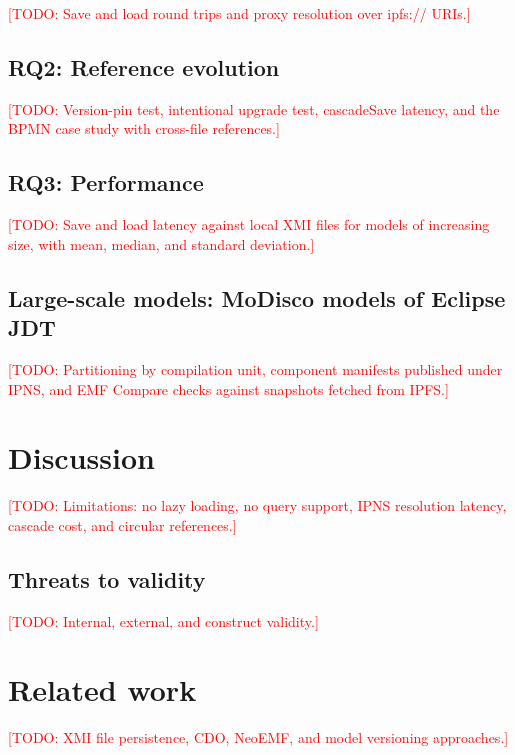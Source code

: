\documentclass[iicol,pdflatex,sn-mathphys-num]{sn-jnl}
\theoremstyle{thmstylethree}%
\newcommand{\todo}[1]{\textcolor{red}{[TODO: #1]}}
\begin{document}
\todo{Save and load round trips and proxy resolution over ipfs:// URIs.}

\subsection{RQ2: Reference evolution}\label{sec:evaluation-rq2}

\todo{Version-pin test, intentional upgrade test, cascadeSave latency, and the
BPMN case study with cross-file references.}

\subsection{RQ3: Performance}\label{sec:evaluation-rq3}

\todo{Save and load latency against local XMI files for models of increasing
size, with mean, median, and standard deviation.}

\subsection{Large-scale models: MoDisco models of Eclipse JDT}\label{sec:evaluation-modisco}

\todo{Partitioning by compilation unit, component manifests published under
IPNS, and EMF Compare checks against snapshots fetched from IPFS.}

\section{Discussion}\label{sec:discussion}

\todo{Limitations: no lazy loading, no query support, IPNS resolution
latency, cascade cost, and circular references.}

\subsection{Threats to validity}\label{sec:threats}

\todo{Internal, external, and construct validity.}

\section{Related work}\label{sec:related}

\todo{XMI file persistence, CDO, NeoEMF, and model versioning approaches.}
\end{document}
